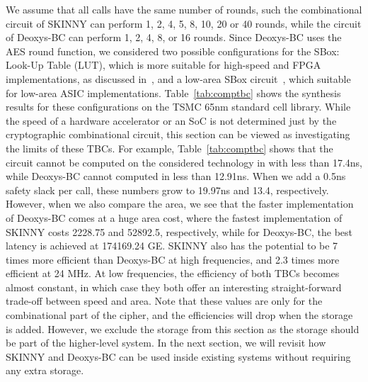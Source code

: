 \documentclass[conference]{IEEEtran}
\begin{document}
We assume that all calls have the same number of rounds, such the combinational circuit of SKINNY can perform 1, 2, 4, 5, 8, 10, 20 or 40 rounds, while the circuit of Deoxys-BC can perform 1, 2, 4, 8, or 16 rounds. Since Deoxys-BC uses the AES round function, we considered two possible configurations for the SBox: Look-Up Table (LUT), which is more suitable for high-speed and FPGA implementations, as discussed in~\cite{khairallah2017looting}, and a low-area SBox circuit~\cite{boyarperlata,tinyaes}, which suitable for low-area ASIC implementations. Table~\ref{tab:comptbc} shows the synthesis results for these configurations on the TSMC 65nm standard cell library. While the speed of a hardware accelerator or an SoC is not determined just by the cryptographic combinational circuit, this section can be viewed as investigating the limits of these TBCs. For example, Table~\ref{tab:comptbc} shows that the circuit cannot be computed on the considered technology in with less than 17.4ns, while Deoxys-BC cannot computed in less than 12.91ns. When we add a 0.5ns safety slack per call, these numbers grow to 19.97ns and 13.4, respectively. However, when we also compare the area, we see that the faster implementation of Deoxys-BC comes at a huge area cost, where the fastest implementation of SKINNY costs 2228.75 and 52892.5, respectively, while for Deoxys-BC, the best latency is achieved at 174169.24 GE. SKINNY also has the potential to be 7 times more efficient than Deoxys-BC at high frequencies, and 2.3 times more efficient at 24 MHz. At low frequencies, the efficiency of both TBCs becomes almost constant, in which case they both offer an interesting straight-forward trade-off between speed and area. Note that these values are only for the combinational part of the cipher, and the efficiencies will drop when the storage is added. However, we exclude the storage from this section as the storage should be part of the higher-level system. In the next section, we will revisit how SKINNY and Deoxys-BC can be used inside existing systems without requiring any extra storage.
\end{document}
